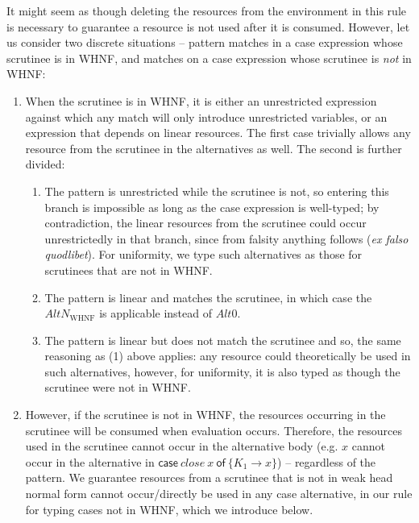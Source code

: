 \documentclass[acmsmall, screen, review]{acmart}
\newcommand{\ccase}[2]{\mathsf{case}~#1~\mathsf{of}~#2}
\begin{document}
It might seem as though deleting the resources from the environment in this
rule is necessary to guarantee a resource is not used after it is consumed.
%
However, let us consider two discrete situations -- pattern matches in a case
expression whose scrutinee is in WHNF, and matches on a case expression whose
scrutinee is \emph{not} in WHNF:
%
\begin{enumerate}
\item When the scrutinee is in WHNF, it is either an unrestricted expression
against which any match will only introduce unrestricted variables, or an
expression that depends on linear resources. The first case trivially allows
any resource from the scrutinee in the alternatives as well. The second is
further divided:
\begin{enumerate}

\item The pattern is unrestricted while the
scrutinee is not, so entering this branch is impossible as long as the case
expression is well-typed; by contradiction, the linear resources from the
scrutinee could occur unrestrictedly in that branch, since from falsity
anything follows (\emph{ex falso quodlibet}).
%
For uniformity, we type such alternatives as those for scrutinees that are not in WHNF.

\item The pattern is linear and matches the scrutinee, in which case the
$AltN_{\textrm{WHNF}}$ is applicable instead of $Alt0$.

\item The pattern is linear but does not match the scrutinee and so, the same
reasoning as (1) above applies: any resource could theoretically be used in
such alternatives, however, for uniformity, it is also typed as though the
scrutinee were not in WHNF.

\end{enumerate}

\item However, if the scrutinee is not in WHNF, the resources occurring in the
scrutinee will be consumed when evaluation occurs. Therefore, the resources
used in the scrutinee cannot occur in the alternative body
(e.g. $x$ cannot occur in the alternative in $\ccase{close~x}{\{K_1 \to x\}}$)
-- regardless of the pattern.
%
%
We guarantee resources from a scrutinee that is not in weak head normal form
cannot occur/directly be used in any case alternative, in our rule for typing
cases not in WHNF, which we introduce below.

\end{enumerate}
\end{document}
